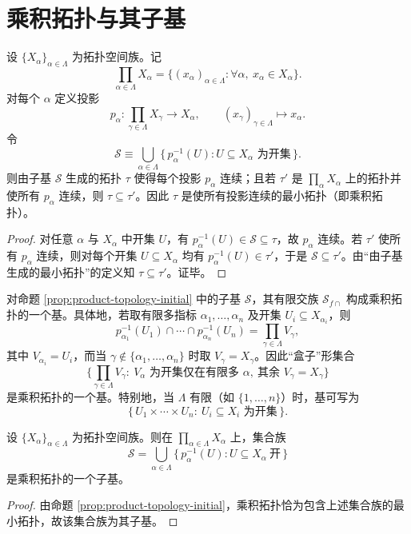 \documentclass[lang=cn,a4paper,newtx,figureplace=section,tableplace=section]{elegantbook}
\begin{document}
 \section{乘积拓扑与其子基}
 
 \begin{proposition}[乘积拓扑的刻画]\label{prop:product-topology-initial}
  设 $\{X_\alpha\}_{\alpha\in\Lambda}$ 为拓扑空间族。记
  \[
   \prod_{\alpha\in\Lambda} X_\alpha
   =\{(x_\alpha)_{\alpha\in\Lambda} : \forall\alpha,\ x_\alpha\in X_\alpha\}.
  \]
  对每个 $\alpha$ 定义投影
  \[
   p_\alpha: \prod_{\gamma\in\Lambda} X_\gamma\to X_\alpha,\qquad (x_\gamma)_{\gamma\in\Lambda}\mapsto x_\alpha.
  \]
  令
  \[
   \mathcal S\equiv\bigcup_{\alpha\in\Lambda}\{\,p_\alpha^{-1}(U): U\subseteq X_\alpha\text{ 为开集}\,\}.
  \]
  则由子基 $\mathcal S$ 生成的拓扑 $\tau$ 使得每个投影 $p_\alpha$ 连续；且若 $\tau'$ 是 $\prod_{\alpha}X_\alpha$ 上的拓扑并使所有 $p_\alpha$ 连续，则 $\tau\subseteq\tau'$。因此 $\tau$ 是使所有投影连续的最小拓扑（即乘积拓扑）。
 \end{proposition}
 
 \begin{proof}
  对任意 $\alpha$ 与 $X_\alpha$ 中开集 $U$，有 $p_\alpha^{-1}(U)\in\mathcal S\subseteq\tau$，故 $p_\alpha$ 连续。若 $\tau'$ 使所有 $p_\alpha$ 连续，则对每个开集 $U\subseteq X_\alpha$ 均有 $p_\alpha^{-1}(U)\in\tau'$，于是 $\mathcal S\subseteq\tau'$。由“由子基生成的最小拓扑”的定义知 $\tau\subseteq\tau'$。证毕。
 \end{proof}
 
 \begin{remark}
  对命题 \ref{prop:product-topology-initial} 中的子基 $\mathcal S$，其有限交族 $\mathcal S_{f\cap}$ 构成乘积拓扑的一个基。具体地，若取有限多指标 $\alpha_1,\dots,\alpha_n$ 及开集 $U_i\subseteq X_{\alpha_i}$，则
  \[
   p_{\alpha_1}^{-1}(U_1)\cap\cdots\cap p_{\alpha_n}^{-1}(U_n)
   = \prod_{\gamma\in\Lambda} V_\gamma,
  \]
  其中 $V_{\alpha_i}=U_i$，而当 $\gamma\notin\{\alpha_1,\dots,\alpha_n\}$ 时取 $V_\gamma=X_\gamma$。因此“盒子”形集合
  \[
   \Big\{\prod_{\gamma\in\Lambda} V_\gamma:\ V_{\alpha}\text{ 为开集仅在有限多 }\alpha,\ \text{其余 }V_\gamma=X_\gamma\Big\}
  \]
  是乘积拓扑的一个基。特别地，当 $\Lambda$ 有限（如 $\{1,\dots,n\}$）时，基可写为
  \[
   \{\,U_1\times\cdots\times U_n:\ U_i\subseteq X_i\text{ 为开集}\,\}.
  \]
  \end{remark}
 
 \begin{proposition}[推论：乘积拓扑的子基]\label{prop:product-subbasis}
  设 $\{X_\alpha\}_{\alpha\in\Lambda}$ 为拓扑空间族。则在 $\prod_{\alpha\in\Lambda} X_\alpha$ 上，集合族
  \[
   \mathcal S=\bigcup_{\alpha\in\Lambda}\{\,p_\alpha^{-1}(U): U\subseteq X_\alpha\ \text{开}\,\}
  \]
  是乘积拓扑的一个子基。
 \end{proposition}
 \begin{proof}
  由命题 \ref{prop:product-topology-initial}，乘积拓扑恰为包含上述集合族的最小拓扑，故该集合族为其子基。
 \end{proof}
 
\end{document}
